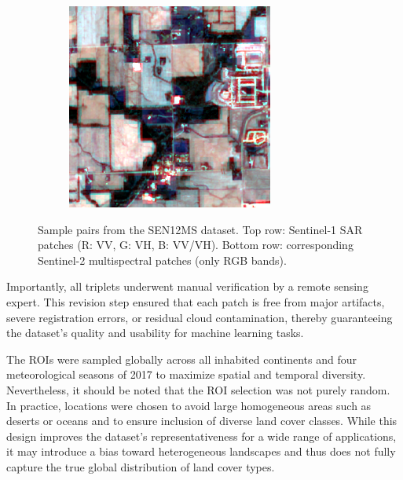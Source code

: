 \begin{figure}[htbp]
\begin{subfigure}{0.18\textwidth}
    \end{subfigure}
    \begin{subfigure}{0.18\textwidth}
        \includegraphics[width=\linewidth]{img/ROIs1970_fall_s2_145_p100.png}
    \end{subfigure}

    \caption[Sample SAR–optical pairs from SEN12MS]{Sample pairs from the SEN12MS dataset. Top row: Sentinel-1 SAR patches (R: VV, G: VH, B: VV/VH). Bottom row: corresponding Sentinel-2 multispectral patches (only RGB bands).}
    \label{fig:sen12ms_pairs}
\end{figure}


Importantly, all triplets underwent manual verification by a remote sensing expert. This revision step ensured that each patch is free from major artifacts, severe registration errors, or residual cloud contamination, thereby guaranteeing the dataset’s quality and usability for machine learning tasks.

The ROIs were sampled globally across all inhabited continents and four meteorological seasons of 2017 to maximize spatial and temporal diversity. Nevertheless, it should be noted that the ROI selection was not purely random. In practice, locations were chosen to avoid large homogeneous areas such as deserts or oceans and to ensure inclusion of diverse land cover classes. While this design improves the dataset’s representativeness for a wide range of applications, it may introduce a bias toward heterogeneous landscapes and thus does not fully capture the true global distribution of land cover types.

